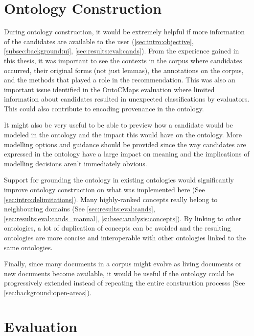 \documentclass[a4paper]{report}
\begin{document}
\section{Ontology Construction}

During ontology construction, it would be extremely helpful if more information of the candidates are available to the user (\ref{sec:intro:objective}, \ref{subsec:background:ui}, \ref{sec:results:eval:cands}).
From the experience gained in this thesis, it was important to see the contexts in the corpus where candidates occurred, their original forms (not just lemmas), the annotations on the corpus, and the methods that played a role in the recommendation.
This was also an important issue identified in the OntoCMaps evaluation where limited information about candidates resulted in unexpected classifications by evaluators.
This could also contribute to encoding provenance in the ontology.

It might also be very useful to be able to preview how a candidate would be modeled in the ontology and the impact this would have on the ontology.
More modelling options and guidance should be provided since the way candidates are expressed in the ontology have a large impact on meaning and the implications of modelling decisions aren't immediately obvious.

Support for grounding the ontology in existing ontologies would significantly improve ontology construction on what was implemented here (See \ref{sec:intro:delimitations}).
Many highly-ranked concepts really belong to neighbouring domains (See \ref{sec:results:eval:cands}, \ref{sec:results:eval:cands_manual}, \ref{subsec:analysis:concepts}).
By linking to other ontologies, a lot of duplication of concepts can be avoided and the resulting ontologies are more concise and interoperable with other ontologies linked to the same ontologies.

Finally, since many documents in a corpus might evolve as living documents or new documents become available, it would be useful if the ontology could be progressively extended instead of repeating the entire construction processs (See \ref{sec:background:open-areas}).

\section{Evaluation}
\end{document}
